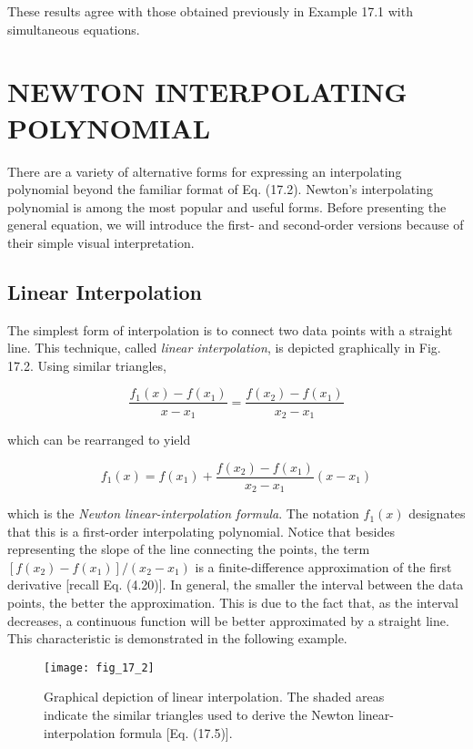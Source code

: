\documentclass[../main.tex]{subfiles}
\begin{document}
\noindent These results agree with those obtained previously in Example 17.1 with simultaneous equations.

\label{cha:cha_P_17_2}
\section{NEWTON INTERPOLATING POLYNOMIAL}

\noindent There are a variety of alternative forms for expressing an interpolating polynomial beyond
the familiar format of Eq. (17.2). Newton's interpolating polynomial is among the most
popular and useful forms. Before presenting the general equation, we will introduce the
first- and second-order versions because of their simple visual interpretation.

\label{cha:cha_P_17_2_1}
\subsection{Linear Interpolation}

\noindent The simplest form of interpolation is to connect two data points with a straight line. This
technique, called \textit{linear interpolation}, is depicted graphically in Fig. 17.2. Using similar
triangles,

\begin{equation}
	\tag{17.4}
	\frac{f_1(x)-f(x_1)}{x - x_1} = \frac{f(x_2) - f(x_1)}{x_2 - x_1}
\end{equation}

\noindent which can be rearranged to yield

\begin{equation}
	\tag{17.5}
	f_1(x) = f(x_1) + \frac{f(x_2) - f(x_1)}{x_2 - x_1} (x - x_1)
\end{equation}

\noindent which is the \textit{Newton linear-interpolation formula}. The notation $f_1 (x)$ designates that this
is a first-order interpolating polynomial. Notice that besides representing the slope of the
line connecting the points, the term $[f(x_2) - f(x_1)]/(x_2 - x_1)$ is a finite-difference approximation of the first derivative [recall Eq. (4.20)]. In general, the smaller the interval
between the data points, the better the approximation. This is due to the fact that, as the
interval decreases, a continuous function will be better approximated by a straight line.
This characteristic is demonstrated in the following example.

\begin{figure}[H] 
	\centering
	\texttt{[image: fig\_17\_2]}
	\caption{\textsf{Graphical depiction of linear interpolation. The shaded areas indicate the similar triangles used
	to derive the Newton linear-interpolation formula [Eq. (17.5)].}}
	\label{fig:fig_17_2}
\end{figure}
\end{document}
